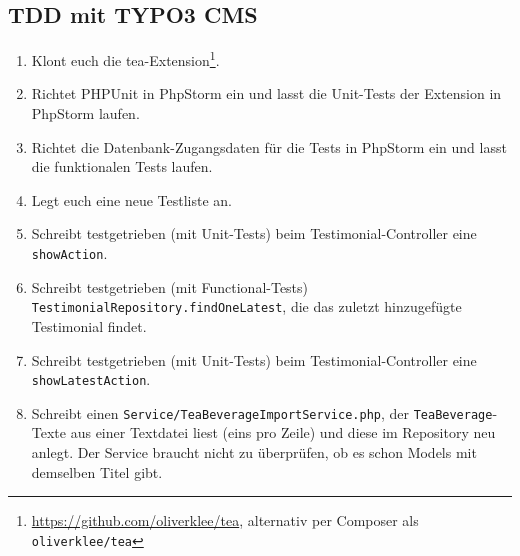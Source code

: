 \documentclass[a4paper,12pt]{scrartcl}
\begin{document}
\subsection{TDD mit TYPO3 CMS}
\begin{enumerate}
  \item Klont euch die tea-Extension\footnote{\url{https://github.com/oliverklee/tea}, alternativ per Composer als \texttt{oliverklee/tea}}.
  \item Richtet PHPUnit in PhpStorm ein und lasst die Unit-Tests der Extension in PhpStorm laufen.
  \item Richtet die Datenbank-Zugangsdaten für die Tests in PhpStorm ein und lasst die funktionalen Tests laufen.
  \item Legt euch eine neue Testliste an.
  \item Schreibt testgetrieben (mit Unit-Tests) beim Testimonial-Controller eine \texttt{showAction}.
  \item Schreibt testgetrieben (mit Functional-Tests) \texttt{TestimonialRepository.findOneLatest}, die das zuletzt hinzugefügte Testimonial findet.
  \item Schreibt testgetrieben (mit Unit-Tests) beim Testimonial-Controller eine \texttt{showLatestAction}.
  \item Schreibt einen \texttt{Service/TeaBeverageImportService.php}, der \texttt{TeaBeverage}-Texte aus einer Textdatei liest (eins pro Zeile) und diese im Repository neu anlegt. Der Service braucht nicht zu überprüfen, ob es schon Models mit demselben Titel gibt.
\end{enumerate}
\end{document}
